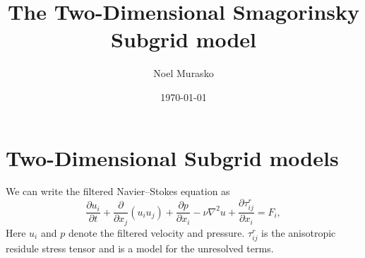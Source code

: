 \documentclass[11pt,a4paper]{article}
\author{Noel Murasko}
\title{The Two-Dimensional Smagorinsky Subgrid model}
\date{\today}
\begin{document}
\maketitle
\noindent 
\section{Two-Dimensional Subgrid models}
We can write the filtered Navier--Stokes equation as
\begin{equation}\label{filteredNS}
\frac{\partial {u}_i}{\partial t} + \frac{\partial }{\partial x_j}({u}_i{u}_j)+\frac{\partial {p}}{\partial x_i}- \nu \nabla^2 {u} +\frac{\partial \tau_{ij}^r}{\partial x_i}= {F}_i,
\end{equation}
Here $u_i$ and $p$ denote the filtered velocity and pressure. $\tau^r_{ij}$ is the anisotropic residule stress tensor and is a model for the unresolved terms. 
\end{document}
